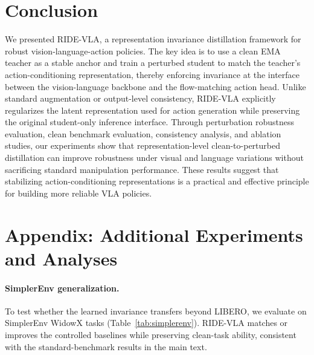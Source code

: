 \documentclass[letterpaper]{article} %
\newcommand{\method}{\textsc{RIDE-VLA}}
\begin{document}
\section{Conclusion}

We presented \method{}, a representation invariance distillation framework for robust vision-language-action policies. The key idea is to use a clean EMA teacher as a stable anchor and train a perturbed student to match the teacher's action-conditioning representation, thereby enforcing invariance at the interface between the vision-language backbone and the flow-matching action head. Unlike standard augmentation or output-level consistency, \method{} explicitly regularizes the latent representation used for action generation while preserving the original student-only inference interface. Through perturbation robustness evaluation, clean benchmark evaluation, consistency analysis, and ablation studies, our experiments show that representation-level clean-to-perturbed distillation can improve robustness under visual and language variations without sacrificing standard manipulation performance. These results suggest that stabilizing action-conditioning representations is a practical and effective principle for building more reliable VLA policies.



\appendix
\section{Appendix: Additional Experiments and Analyses}

\paragraph{SimplerEnv generalization.}
To test whether the learned invariance transfers beyond LIBERO, we evaluate on SimplerEnv WidowX tasks (Table~\ref{tab:simplerenv}). \method{} matches or improves the controlled baselines while preserving clean-task ability, consistent with the standard-benchmark results in the main text.
\end{document}
